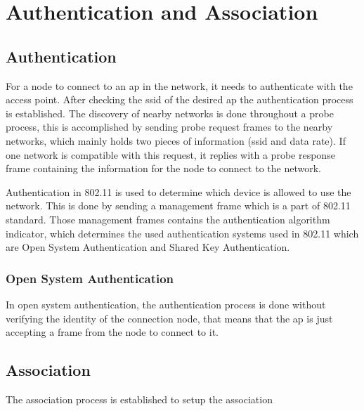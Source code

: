 \chapter{Authentication and Association}
\label{chap:auth_association_cycle}

\section{Authentication}
\label{sec:authentication}
For a node to connect to an \ac{ap} in the network, it needs to authenticate with the access
point. After checking the \ac{ssid} of the desired \ac{ap} the authentication process is established. The discovery
of nearby networks is done throughout a probe process, this is accomplished by sending probe request frames
to the nearby networks, which mainly holds two pieces of information (\ac{ssid} and data rate).\cite{roshan_leary_2004}
If one network is compatible with this request, it replies with a probe response frame containing the information for
the node to connect to the network.\cite{gast_2005}

\newParagraph
Authentication in 802.11 is used to determine which device is allowed to use the network. This is done by sending
a management frame which is a part of 802.11 standard. Those management frames contains the authentication algorithm
indicator, which determines the used authentication systems used in 802.11 which are Open System Authentication and
Shared Key Authentication.\cite{gast_2005}

\subsection{Open System Authentication}
\label{sub:open_system_auth}
In open system authentication, the authentication process is done without verifying the identity of the connection node,
that means that the \ac{ap} is just accepting a frame from the node to connect to it.


\section{Association}
\label{sec:association}
The association process is established to setup the association
